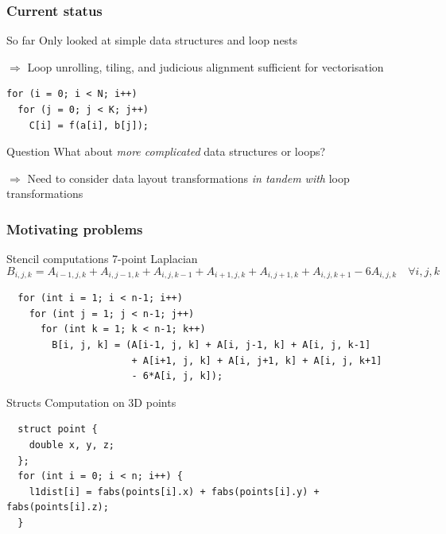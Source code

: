 \documentclass[presentation,aspectratio=43,10pt]{beamer}
\date{}
\begin{document}
\begin{frame}
  \maketitle
\end{frame}

\begin{frame}[fragile]
  \frametitle{Current status}
  
  \begin{answer}{So far}
    Only looked at simple data structures and loop nests
    
  $\Rightarrow$ Loop unrolling, tiling, and judicious alignment
    sufficient for vectorisation
\begin{verbatim}
for (i = 0; i < N; i++)
  for (j = 0; j < K; j++)
    C[i] = f(a[i], b[j]);
\end{verbatim}
  \end{answer}

  \begin{challenge}{Question}
  What about \emph{more complicated} data structures or loops?
    
  $\Rightarrow$ Need to consider data layout transformations
  \emph{in tandem with} loop transformations
  \end{challenge}
\end{frame}

\begin{frame}[fragile]
  \frametitle{Motivating problems}
  \begin{challenge}{Stencil computations}
    7-point Laplacian
    \begin{equation*}
      B_{i,j,k} = A_{i-1,j,k} + A_{i,j-1,k} + A_{i,j,k-1} +
      A_{i+1,j,k} + A_{i,j+1,k} + A_{i,j,k+1} - 6 A_{i,j,k} \quad
      \forall i,j,k
    \end{equation*}
\begin{verbatim}
  for (int i = 1; i < n-1; i++)
    for (int j = 1; j < n-1; j++)
      for (int k = 1; k < n-1; k++)
        B[i, j, k] = (A[i-1, j, k] + A[i, j-1, k] + A[i, j, k-1]
                      + A[i+1, j, k] + A[i, j+1, k] + A[i, j, k+1]
                      - 6*A[i, j, k]);
\end{verbatim}
  \end{challenge}
  \begin{exampleblock}{Structs}
    Computation on 3D points
\begin{verbatim}
  struct point {
    double x, y, z;
  };
  for (int i = 0; i < n; i++) {
    l1dist[i] = fabs(points[i].x) + fabs(points[i].y) + fabs(points[i].z);
  }
\end{verbatim}
  \end{exampleblock}
\end{frame}
\end{document}
